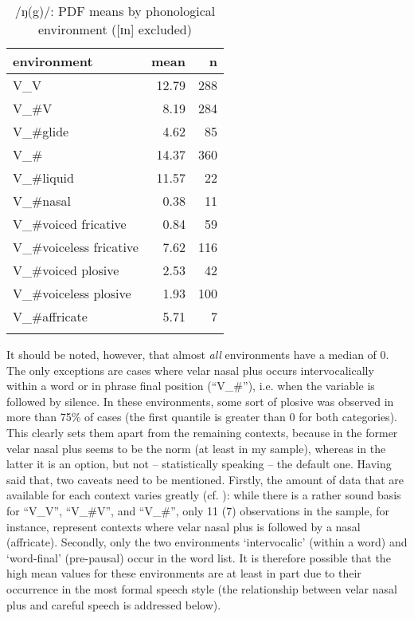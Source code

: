 \begin{table}
	
	\caption{/ŋ(g)/: PDF means by phonological environment ([ɪn] excluded)}
	\label{tab.ng.mean.environment}
	\begin{tabular}{lrr}
		\lsptoprule
		environment & mean \isi{PDF} & n\\
		\midrule
		V\_V & 12.79 & 288\\
		V\_\#V & 8.19 & 284\\
		V\_\#glide & 4.62 & 85\\
		V\_\# & 14.37 & 360\\
		V\_\#liquid & 11.57 & 22\\
		V\_\#nasal & 0.38 & 11\\
		V\_\#voiced fricative & 0.84 & 59\\
		V\_\#voiceless fricative & 7.62 & 116\\
		V\_\#voiced plosive & 2.53 & 42\\
		V\_\#voiceless plosive & 1.93 & 100\\
		V\_\#affricate & 5.71 & 7\\
		\lspbottomrule
	\end{tabular}
\end{table}

It should be noted, however, that almost \emph{all} environments have a median  of 0.
The only exceptions are cases where velar nasal plus occurs intervocalically within a word or in phrase final position (``V\_\#''), i.e. when the variable is followed by silence.
In these environments, some sort of plosive was observed in more than 75\% of cases (the first quantile is greater than 0 for both categories).
This clearly sets them apart from the remaining contexts, because in the former velar nasal plus seems to be the norm (at least in my sample), whereas in the latter it is an option, but not -- statistically speaking -- the default one.
Having said that, two caveats need to be mentioned.
Firstly, the amount of data that are available for each context varies greatly (cf. ): while there is a rather sound basis for ``V\_V'', ``V\_\#V'', and ``V\_\#'', only 11 (7) observations in the sample, for instance, represent contexts where velar nasal plus is followed by a nasal (affricate).
Secondly, only the two environments `intervocalic' (within a word) and `word-final' (pre-pausal) occur in the word list.
It is therefore possible that the high mean  values for these environments are at least in part due to their occurrence in the most formal speech style (the relationship between velar nasal plus and careful speech is addressed below).

